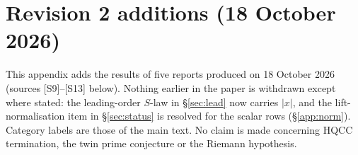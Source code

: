 \documentclass[11pt]{article}
\theoremstyle{definition}
\begin{document}
\appendix
\section{Revision 2 additions (18 October 2026)}\label{app:rev2}
This appendix adds the results of five reports produced on 18 October 2026 (sources [S9]--[S13] below). Nothing earlier in the paper is
withdrawn except where stated: the leading-order $S$-law in \S\ref{sec:lead} now carries $|x|$, and the lift-normalisation item in
\S\ref{sec:status} is resolved for the scalar rows (\S\ref{app:norm}). Category labels are those of the main text. No claim is made concerning
HQCC termination, the twin prime conjecture or the Riemann hypothesis.
\end{document}
